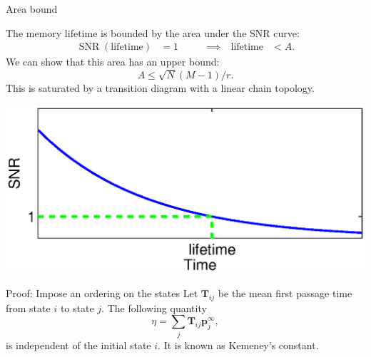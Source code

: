 \documentclass[final,hyperref={pdfpagelabels=false,bookmarks=false}]{beamer}
\DeclareMathOperator{\SNR}{SNR}
\newcommand{\eq}{\mathbf{p}^\infty}
\newcommand{\fpt}{\mathbf{T}}
\begin{document}
\begin{frame}{}
\begin{columns}[t]
\begin{column}{0.415\linewidth}
\begin{block}{Area bound}
%
 \parbox[c]{0.6\linewidth}{
  The memory lifetime is bounded by the area under the SNR curve:
  \begin{equation*}
  \begin{aligned}
    \SNR(\text{lifetime})&=1
    &\qquad
    \implies
    \quad
    \text{lifetime} &< A.
  \end{aligned}
  \end{equation*}
  We can show that this area has an upper bound:
  \begin{equation*}
    A \leq \sqrt{N}(M-1)/r.
  \end{equation*}
  This is saturated by a transition diagram with a linear chain topology.
 }
 \hfill
 \parbox[c]{0.37\linewidth}{
  \begin{center}
    \includegraphics[width=0.9375\linewidth]{lifetime.eps}
  \end{center}
 }
%
\end{block}


\begin{block}{Proof: Impose an ordering on the states}
%
 Let $\fpt_{ij}$ be the mean first passage time from state $i$ to state $j$.
 The following quantity
 \begin{equation*}
   \eta = \sum_j \fpt_{ij} \eq_j,
 \end{equation*}
 is independent of the initial state $i$.
 It is known as Kemeney's constant. 


\end{block}
\end{column}
\end{columns}
\end{frame}
\end{document}
